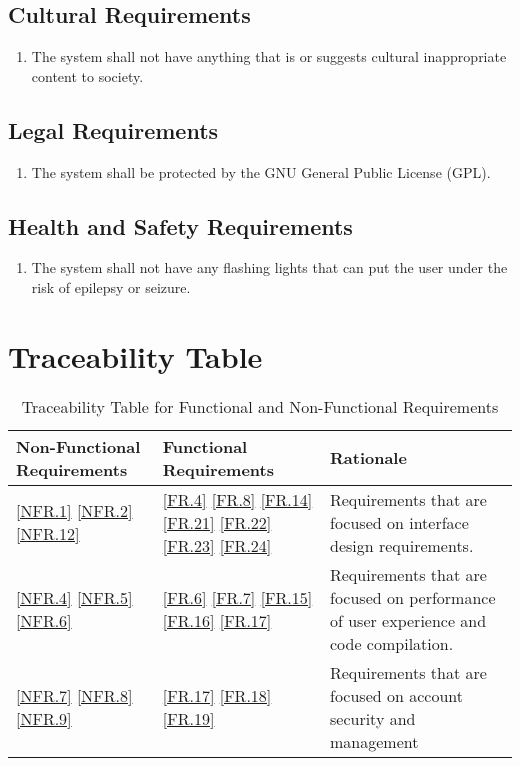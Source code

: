 \documentclass[12pt, titlepage]{article}
\begin{document}
\subsection{Cultural Requirements}
\begin{enumerate}[label=NFR.\arabic*, resume]
    \item The system shall not have anything that is or suggests cultural inappropriate content to society. \label{NFR.10}
\end{enumerate}
\subsection{Legal Requirements}
\begin{enumerate}[label=NFR.\arabic*, resume]
    \item The system shall be protected by the GNU General Public License (GPL). \label{NFR.11}
\end{enumerate}
\subsection{Health and Safety Requirements}
\begin{enumerate}[label=NFR.\arabic*, resume]
    \item The system shall not have any flashing lights that can put the user under the risk of epilepsy or seizure. \label{NFR.12}
\end{enumerate}

\section{Traceability Table}


\begin{table}[H]
    \begin{tabularx}{\textwidth}{|p{3cm}|p{3cm}|X|}
    \hline
    Non-Functional Requirements & Functional Requirements & Rationale \\
    \hline
    \ref{NFR.1} \ref{NFR.2} \ref{NFR.12} & \ref{FR.4} \ref{FR.8} \ref{FR.14} \ref{FR.21} \ref{FR.22} \ref{FR.23} \ref{FR.24} & Requirements that are focused on interface design requirements.\\
    \hline
    \ref{NFR.4} \ref{NFR.5} \ref{NFR.6} & \ref{FR.6} \ref{FR.7} \ref{FR.15} \ref{FR.16} \ref{FR.17} & Requirements that are focused on performance of user experience and code compilation.  \\
    \hline
    \ref{NFR.7} \ref{NFR.8}  \ref{NFR.9}& \ref{FR.17} \ref{FR.18} \ref{FR.19} & Requirements that are focused on account security and management\\
    \hline
    \end{tabularx}
    \caption{Traceability Table for Functional and Non-Functional Requirements}
    \label{tab:trace}
\end{table}
\end{document}
